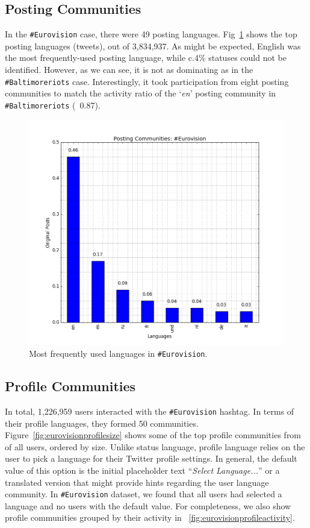 \documentclass{llncs}
\begin{document}
\subsection{Posting Communities}\label{eurovisionpostingcomm}

In the {\texttt{\#Eurovision}} case, there were 49 posting
languages. Fig~\ref{fig:eurovisionlangfreq} shows the top posting
languages (tweets), out of 3,834,937. As might be expected, English
was the most frequently-used posting language, while c.4\% statuses
could not be identified. However, as we can see, it is not as
dominating as in the {\texttt{\#Baltimoreriots}} case. Interestingly,
it took participation from eight posting communities to match the
activity ratio of the `{\emph{en}}' posting community in
{\texttt{\#Baltimoreriots}} (~0.87).

\begin{figure}[htb]
\centering
\includegraphics[width=\columnwidth]{images/eurovision_langfreq.png}
\caption{Most frequently used languages in {\texttt{\#Eurovision}}.}
\label{fig:eurovisionlangfreq}
\end{figure}

\subsection{Profile Communities}\label{ppcomm}

In total, 1,226,959 users interacted with the {\texttt{\#Eurovision}}
hashtag. In terms of their profile languages, they formed 50
communities. Figure~\ref{fig:eurovisionprofilesize} shows some of the
top profile communities from of all users, ordered by size. Unlike
status language, profile language relies on the user to pick a
language for their Twitter profile settings. In general, the default
value of this option is the initial placeholder text ``{\emph{Select
Language...}}'' or a translated version that might provide hints
regarding the user language community. In {\texttt{\#Eurovision}}
dataset, we found that all users had selected a language and no users
with the default value.  For completeness, we also show profile
communities grouped by their activity in
~\ref{fig:eurovisionprofileactivity}.
\end{document}
